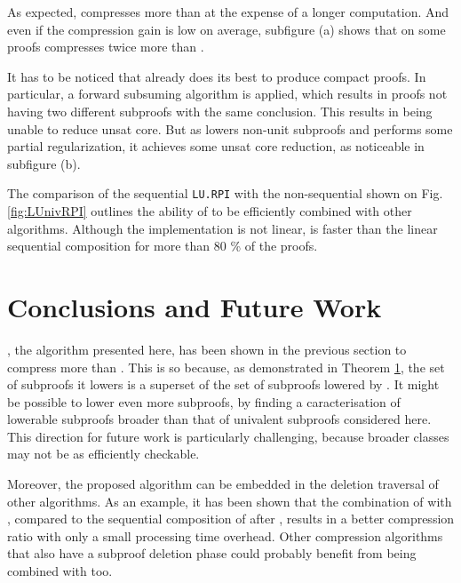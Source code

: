 \documentclass{llncs}
\begin{document}


As expected, {\LowerUnivalents} compresses more than {\LowerUnits} at the expense of a longer
computation. And even if the compression gain is low on average, subfigure (a) shows that
on some proofs {\LowerUnivalents} compresses twice more than {\LowerUnits}.

It has to be noticed that \veriT already does its best to produce compact proofs. In particular,
a forward subsuming algorithm is applied, which results in proofs not having two different subproofs
with the same conclusion. This results in {\LowerUnits} being unable to reduce unsat core.
But as {\LowerUnivalents} lowers non-unit subproofs and performs some partial regularization, it
achieves some unsat core reduction, as noticeable in subfigure (b).

The comparison of the sequential \texttt{LU.RPI} with the non-sequential {\LUnivRPI} shown on Fig.
\ref{fig:LUnivRPI} outlines the ability of {\LowerUnivalents} to be efficiently combined with other
algorithms. Although the implementation is not linear, {\LUnivRPI} is faster than the linear
sequential composition for more than 80 \% of the proofs.







%

%

\section{Conclusions and Future Work}

{\LowerUnivalents}, the algorithm presented here, has been shown in the previous section to compress more than {\LowerUnits}. This is so because, as demonstrated in Theorem \ref{}, the set of subproofs it lowers is a superset of the set of subproofs lowered by {\LowerUnits}. It might be possible to lower even more subproofs, by finding a caracterisation of lowerable subproofs broader than that of univalent subproofs considered here. This direction for future work is particularly challenging, because broader classes may not be as efficiently checkable.

Moreover, the proposed algorithm can be embedded in the deletion traversal of other algorithms.  As an example, it has been shown that the combination of {\LowerUnivalents} with {\RPI}, compared to the
sequential composition of {\LowerUnits} after {\RPI}, results in a better compression ratio with only a small
processing time overhead. Other compression algorithms that also have a subproof deletion phase could probably
benefit from being combined with {\LowerUnivalents} too.
\end{document}
